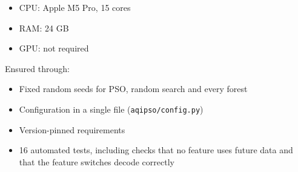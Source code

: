 \begin{itemize}
\item CPU: Apple M5 Pro, 15 cores
\item RAM: 24 GB
\item GPU: not required
\end{itemize}

Ensured through:
\begin{itemize}
\item Fixed random seeds for PSO, random search and every forest
\item Configuration in a single file (\texttt{aqipso/config.py})
\item Version-pinned requirements
\item 16 automated tests, including checks that no feature uses future data and that the feature switches decode correctly
\end{itemize}
